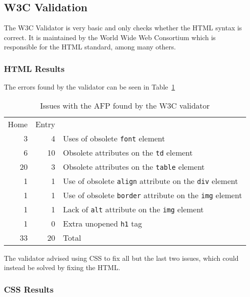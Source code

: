 \documentclass[bsc,frontabs,oneside,singlespacing,parskip,deptreport,logo]{infthesis}
\begin{document}
\subsection{W3C Validation}

The W3C Validator \cite{w3c_validator} is very basic and only checks whether the HTML syntax is correct. It is maintained by the World Wide Web Consortium which is responsible for the HTML standard, among many others.

\subsubsection{HTML Results}

The errors found by the validator can be seen in Table~\ref{W3C-current}

\begin{table}[h]
\centering
{}
\begin{tabularx}{0.5\textwidth}{rrl}
Home & Entry &                                                                   \\
3    & 4     & Uses of obsolete \verb|font| element                               \\
6    & 10    & Obsolete attributes on the \verb|td| element                      \\
20   & 3     & Obsolete attributes on the \verb|table| element                   \\
1    & 1     & Use of obsolete \verb|align| attribute on the \verb|div| element  \\
1    & 1     & Use of obsolete \verb|border| attribute on the \verb|img| element \\
1    & 1     & Lack of \verb|alt| attribute on the \verb|img| element            \\
1    & 0     & Extra unopened \verb|h1| tag                                      \\ \hline
33   & 20    & Total                                                              
\end{tabularx}
\caption{Issues with the AFP found by the W3C validator}
\label{W3C-current}
\end{table}

The validator advised using CSS to fix all but the last two issues, which could instead be solved by fixing the HTML.

\subsubsection{CSS Results} \label{W3CCSS}
\end{document}
